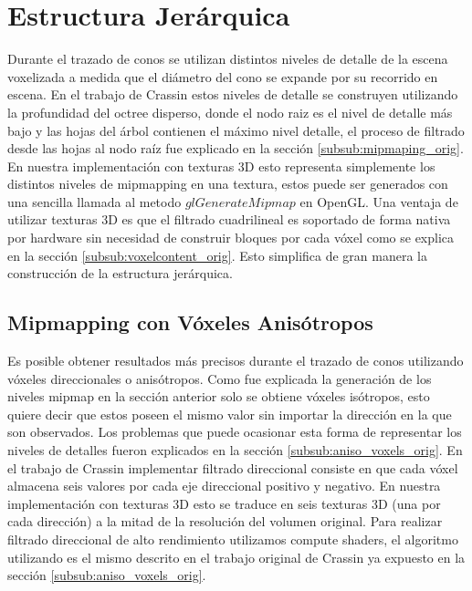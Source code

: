 \section{Estructura Jerárquica} %
\label{sec:estructura_jerarquica}
Durante el trazado de conos se utilizan distintos niveles de detalle de la escena voxelizada a medida que el diámetro del cono se expande por su recorrido en escena. En el trabajo de Crassin estos niveles de detalle se construyen utilizando la profundidad del octree disperso, donde el nodo raiz es el nivel de detalle más bajo y las hojas del árbol contienen el máximo nivel detalle, el proceso de filtrado desde las hojas al nodo raíz fue explicado en la sección \ref{subsub:mipmaping_orig}. En nuestra implementación con texturas 3D esto representa simplemente los distintos niveles de mipmapping en una textura, estos puede ser generados con una sencilla llamada al metodo $glGenerateMipmap$ en OpenGL. Una ventaja de utilizar texturas 3D es que el filtrado cuadrilineal es soportado de forma nativa por hardware sin necesidad de construir bloques por cada vóxel como se explica en la sección \ref{subsub:voxelcontent_orig}. Esto simplifica de gran manera la construcción de la estructura jerárquica.

\subsection{Mipmapping con Vóxeles Anisótropos} %
\label{sub:mipmapping_direccioanl}
Es posible obtener resultados más precisos durante el trazado de conos utilizando vóxeles direccionales o anisótropos. Como fue explicada la generación de los niveles mipmap en la sección anterior solo se obtiene vóxeles isótropos, esto quiere decir que estos poseen el mismo valor sin importar la dirección en la que son observados. Los problemas que puede ocasionar esta forma de representar los niveles de detalles fueron explicados en la sección \ref{subsub:aniso_voxels_orig}. En el trabajo de Crassin implementar filtrado direccional consiste en que cada vóxel almacena seis valores por cada eje direccional positivo y negativo. En nuestra implementación con texturas 3D esto se traduce en seis texturas 3D (una por cada dirección) a la mitad de la resolución del volumen original. Para realizar filtrado direccional de alto rendimiento utilizamos compute shaders, el algoritmo utilizando es el mismo descrito en el trabajo original de Crassin ya expuesto en la sección \ref{subsub:aniso_voxels_orig}.

